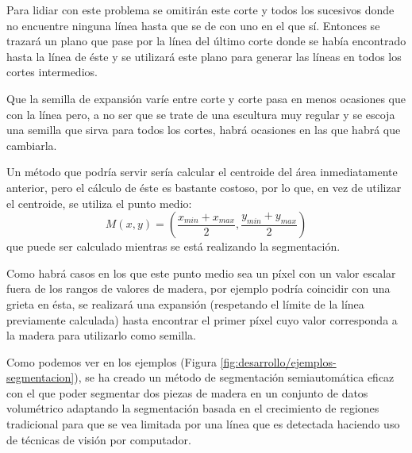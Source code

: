 Para lidiar con este problema se omitirán este corte y todos los sucesivos donde no encuentre ninguna línea hasta que se de con uno en el que sí. Entonces se trazará un plano que pase por la línea del último corte donde se había encontrado hasta la línea de éste y se utilizará este plano para generar las líneas en todos los cortes intermedios.

Que la semilla de expansión varíe entre corte y corte pasa en menos ocasiones que con la línea pero, a no ser que se trate de una escultura muy regular y se escoja una semilla que sirva para todos los cortes, habrá ocasiones en las que habrá que cambiarla.

Un método que podría servir sería calcular el centroide del área inmediatamente anterior, pero el cálculo de éste es bastante costoso, por lo que, en vez de utilizar el centroide, se utiliza el punto medio: 
$$ M(x,y) = (\frac{x_{min} + x_{max}}{2}, \frac{y_{min} + y_{max}}{2}) $$
que puede ser calculado mientras se está realizando la segmentación.

Como habrá casos en los que este punto medio sea un píxel con un valor escalar fuera de los rangos de valores de madera, por ejemplo podría coincidir con una grieta en ésta, se realizará una expansión (respetando el límite de la línea previamente calculada) hasta encontrar el primer píxel cuyo valor corresponda a la madera para utilizarlo como semilla.

Como podemos ver en los ejemplos (Figura \ref{fig:desarrollo/ejemplos-segmentacion}), se ha creado un método de segmentación semiautomática eficaz con el que poder segmentar dos piezas de madera en un conjunto de datos volumétrico adaptando la segmentación basada en el crecimiento de regiones tradicional para que se vea limitada por una línea que es detectada haciendo uso de técnicas de visión por computador.

